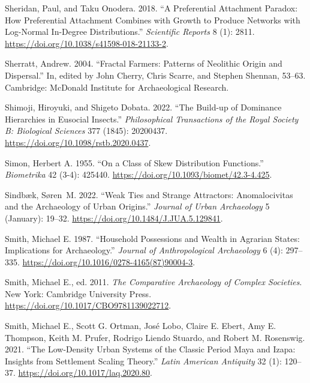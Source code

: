 \documentclass[
  12pt,
  a4paper, twoside]{book}
\newlength{\cslhangindent}
\newlength{\cslentryspacingunit} %
\newenvironment{CSLReferences}[2] %
 {%
  \setlength{\parindent}{0pt}
  \ifodd #1
  \let\oldpar\par
  \def\par{\hangindent=\cslhangindent\oldpar}
  \fi
  \setlength{\parskip}{#2\cslentryspacingunit}
 }%
 {}
\begin{document}
\begin{CSLReferences}{1}{0}
\leavevmode{}%
Sheridan, Paul, and Taku Onodera. 2018. {``A Preferential Attachment Paradox: How Preferential Attachment Combines with Growth to Produce Networks with Log-Normal In-Degree Distributions.''} \emph{Scientific Reports} 8 (1): 2811. \url{https://doi.org/10.1038/s41598-018-21133-2}.

\leavevmode{}%
Sherratt, Andrew. 2004. {``Fractal Farmers: Patterns of Neolithic Origin and Dispersal.''} In, edited by John Cherry, Chris Scarre, and Stephen Shennan, 53--63. Cambridge: McDonald Institute for Archaeological Research.

\leavevmode{}%
Shimoji, Hiroyuki, and Shigeto Dobata. 2022. {``The Build-up of Dominance Hierarchies in Eusocial Insects.''} \emph{Philosophical Transactions of the Royal Society B: Biological Sciences} 377 (1845): 20200437. \url{https://doi.org/10.1098/rstb.2020.0437}.

\leavevmode{}%
Simon, Herbert A. 1955. {``On a Class of Skew Distribution Functions.''} \emph{Biometrika} 42 (3-4): 425440. \url{https://doi.org/10.1093/biomet/42.3-4.425}.

\leavevmode{}%
Sindbæk, Søren~M. 2022. {``Weak Ties and Strange Attractors: Anomalocivitas and the Archaeology of Urban Origins.''} \emph{Journal of Urban Archaeology} 5 (January): 19--32. \url{https://doi.org/10.1484/J.JUA.5.129841}.

\leavevmode{}%
Smith, Michael E. 1987. {``Household Possessions and Wealth in Agrarian States: Implications for Archaeology.''} \emph{Journal of Anthropological Archaeology} 6 (4): 297--335. \url{https://doi.org/10.1016/0278-4165(87)90004-3}.

\leavevmode{}%
Smith, Michael E., ed. 2011. \emph{The Comparative Archaeology of Complex Societies}. New York: Cambridge University Press. \url{https://doi.org/10.1017/CBO9781139022712}.

\leavevmode{}%
Smith, Michael E., Scott G. Ortman, José Lobo, Claire E. Ebert, Amy E. Thompson, Keith M. Prufer, Rodrigo Liendo Stuardo, and Robert M. Rosenswig. 2021. {``The Low-Density Urban Systems of the Classic Period Maya and Izapa: Insights from Settlement Scaling Theory.''} \emph{Latin American Antiquity} 32 (1): 120--37. \url{https://doi.org/10.1017/laq.2020.80}.


\end{CSLReferences}
\end{document}
